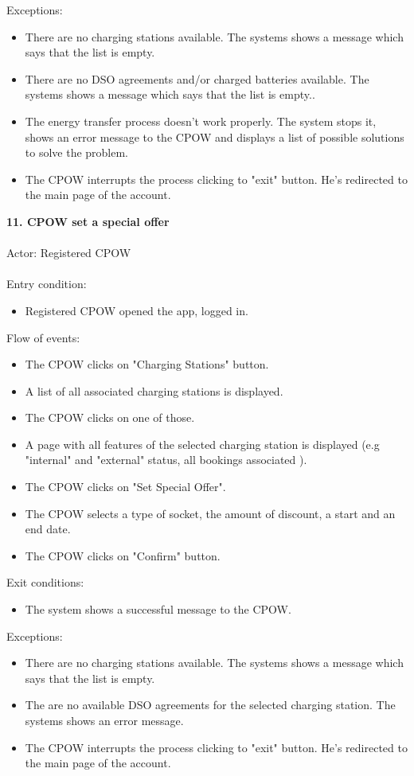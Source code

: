 \documentclass[a4paper]{report}
\begin{document}
Exceptions:
\begin{itemize}
\item There are no charging stations available. The systems shows a message which says that the list is empty.
\item There are no DSO agreements and/or charged batteries available. The systems shows a message which says that the list is empty..
\item The energy transfer process doesn't work properly. The system stops it, shows an error message to the CPOW and displays a list of possible solutions to solve the problem.
\item The CPOW interrupts the process clicking to "exit" button. He's redirected to the main page of the account.
\end{itemize}
\textbf{11. CPOW set a special offer}\label{uc:8}
\\ \\
Actor: Registered CPOW \\ \\
Entry condition:
\begin{itemize}
\item Registered CPOW opened the app, logged in.
\end{itemize}
Flow of events:
\begin{itemize}
\item The CPOW clicks on "Charging Stations" button.
\item A list of all associated charging stations is displayed.
\item The CPOW clicks on one of those.
\item A page with all features of the selected charging station is displayed (e.g "internal" and "external" status, all bookings associated ).
\item The CPOW clicks on "Set Special Offer".
\item The CPOW selects a type of socket, the amount of discount, a start and an end date.
\item The CPOW clicks on "Confirm" button.
\end{itemize}
Exit conditions:
\begin{itemize}
\item The system shows a successful message to the CPOW.
\end{itemize}
Exceptions:
\begin{itemize}
\item There are no charging stations available. The systems shows a message which says that the list is empty.
\item The are no available DSO agreements for the selected charging station. The systems shows an error message.
\item The CPOW interrupts the process clicking to "exit" button. He's redirected to the main page of the account.
\end{itemize}
\end{document}
